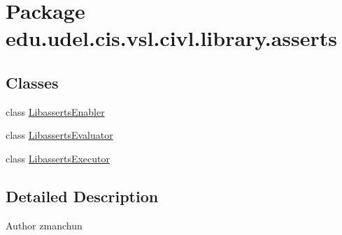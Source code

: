 \hypertarget{namespaceedu_1_1udel_1_1cis_1_1vsl_1_1civl_1_1library_1_1asserts}{}\section{Package edu.\+udel.\+cis.\+vsl.\+civl.\+library.\+asserts}
\label{namespaceedu_1_1udel_1_1cis_1_1vsl_1_1civl_1_1library_1_1asserts}
\subsection*{Classes}
\begin{DoxyCompactItemize}
\item 
class \hyperlink{classedu_1_1udel_1_1cis_1_1vsl_1_1civl_1_1library_1_1asserts_1_1LibassertsEnabler}{Libasserts\+Enabler}
\item 
class \hyperlink{classedu_1_1udel_1_1cis_1_1vsl_1_1civl_1_1library_1_1asserts_1_1LibassertsEvaluator}{Libasserts\+Evaluator}
\item 
class \hyperlink{classedu_1_1udel_1_1cis_1_1vsl_1_1civl_1_1library_1_1asserts_1_1LibassertsExecutor}{Libasserts\+Executor}
\end{DoxyCompactItemize}


\subsection{Detailed Description}
\begin{DoxyAuthor}{Author}
zmanchun 
\end{DoxyAuthor}
